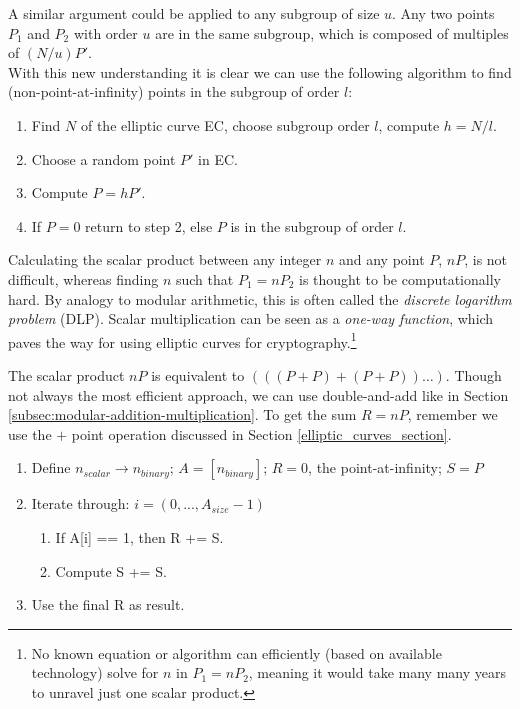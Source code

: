 A similar argument could be applied to any subgroup of size $u$. Any two points $P_1$ and $P_2$ with order $u$ are in the same subgroup, which is composed of multiples of $(N/u) P'$.
\\ \newline
With this new understanding it is clear we can use the following algorithm to find (non-point-at-infinity) points in the subgroup of order $l$:
\begin{enumerate}
    \item Find $N$ of the elliptic curve EC, choose subgroup order $l$, compute $h=N/l$.
    \item Choose a random point $P'$ in EC.
    \item Compute $P=h P'$.
    \item If $P=0$ return to step 2, else $P$ is in the subgroup of order $l$.
\end{enumerate}

Calculating the scalar product between any integer $n$ and any point $P$, $nP$, is not difficult, whereas finding $n$ such that $P_1 = n P_2$ is thought to be computationally hard. By analogy to modular arithmetic, this is often called the {\em discrete logarithm problem} (DLP). Scalar multiplication can be seen as a {\em one-way function}, which paves the way for using elliptic curves for cryptography.\footnote{No known equation or algorithm can efficiently (based on available technology) solve for $n$ in $P_1 = n P_2$, meaning it would take many many years to unravel just one scalar product.}

The scalar product $nP$ is equivalent to $(((P+P)+(P+P))…)$. Though not always the most efficient approach, we can use double-and-add like in Section \ref{subsec:modular-addition-multiplication}. To get the sum $R = n P$, remember we use the $+$ point operation discussed in Section \ref{elliptic_curves_section}.

\begin{enumerate}
	\item Define $n_{scalar} \rightarrow n_{binary}$; $A = [n_{binary}]$; $R = 0$, the point-at-infinity; $S = P$
	\item Iterate through: $i = (0,...,A_{size} - 1)$
	\begin{enumerate}
		\item If A[i] == 1, then R += S.
		\item Compute S += S.
	\end{enumerate}
	\item Use the final R as result.
\end{enumerate}


